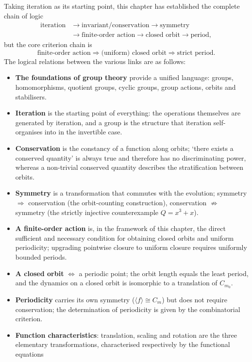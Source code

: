 \begin{remark}\label{rem:chapter_summary}
Taking iteration as its starting point, this chapter has established the complete chain of logic
\[
\begin{aligned}
\text{iteration}
&\to\text{invariant/conservation}\to\text{symmetry}\\
&\to\text{finite-order action}\to\text{closed orbit}\to\text{period},
\end{aligned}
\]
but the core criterion chain is
\[
\text{finite-order action}\Longrightarrow\text{(uniform) closed orbit}\Longrightarrow\text{strict period}.
\]
The logical relations between the various links are as follows:
\begin{itemize}
    \item \textbf{The foundations of group theory} provide a unified language: groups, homomorphisms, quotient groups, cyclic groups, group actions, orbits and stabilisers.
    \item \textbf{Iteration} is the starting point of everything: the operations themselves are generated by iteration, and a group is the structure that iteration self-organises into in the invertible case.
    \item \textbf{Conservation} is the constancy of a function along orbits; `there exists a conserved quantity' is always true and therefore has no discriminating power, whereas a non-trivial conserved quantity describes the stratification between orbits.
    \item \textbf{Symmetry} is a transformation that commutes with the evolution; symmetry $\Rightarrow$ conservation (the orbit-counting construction), conservation $\nRightarrow$ symmetry (the strictly injective counterexample $Q=x^3+x$).
    \item \textbf{A finite-order action} is, in the framework of this chapter, the direct sufficient and necessary condition for obtaining closed orbits and uniform periodicity; upgrading pointwise closure to uniform closure requires uniformly bounded periods.
    \item \textbf{A closed orbit} $\iff$ a periodic point; the orbit length equals the least period, and the dynamics on a closed orbit is isomorphic to a translation of $C_{m_0}$.
    \item \textbf{Periodicity} carries its own symmetry ($\langle f\rangle\cong C_m$) but does not require conservation; the determination of periodicity is given by the combinatorial criterion.
    \item \textbf{Function characteristics}: translation, scaling and rotation are the three elementary transformations, characterised respectively by the functional equations

\end{itemize}
\end{remark}
